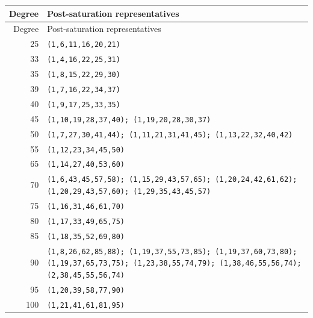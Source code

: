 \begin{longtable}{rp{}}\toprule Degree & Post-saturation representatives \\
\midrule\endfirsthead
\toprule Degree & Post-saturation representatives \\
\midrule\endhead
25 & \texttt{(1,6,11,16,20,21)} \\
33 & \texttt{(1,4,16,22,25,31)} \\
35 & \texttt{(1,8,15,22,29,30)} \\
39 & \texttt{(1,7,16,22,34,37)} \\
40 & \texttt{(1,9,17,25,33,35)} \\
45 & \texttt{(1,10,19,28,37,40); (1,19,20,28,30,37)} \\
50 & \texttt{(1,7,27,30,41,44); (1,11,21,31,41,45); (1,13,22,32,40,42)} \\
55 & \texttt{(1,12,23,34,45,50)} \\
65 & \texttt{(1,14,27,40,53,60)} \\
70 & \texttt{(1,6,43,45,57,58); (1,15,29,43,57,65); (1,20,24,42,61,62); (1,20,29,43,57,60); (1,29,35,43,45,57)} \\
75 & \texttt{(1,16,31,46,61,70)} \\
80 & \texttt{(1,17,33,49,65,75)} \\
85 & \texttt{(1,18,35,52,69,80)} \\
90 & \texttt{(1,8,26,62,85,88); (1,19,37,55,73,85); (1,19,37,60,73,80); (1,19,37,65,73,75); (1,23,38,55,74,79); (1,38,46,55,56,74); (2,38,45,55,56,74)} \\
95 & \texttt{(1,20,39,58,77,90)} \\
100 & \texttt{(1,21,41,61,81,95)} \\
\bottomrule\end{longtable}
